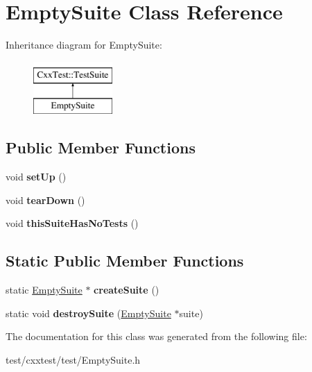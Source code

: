 \hypertarget{classEmptySuite}{\section{Empty\-Suite Class Reference}
\label{classEmptySuite}
}
Inheritance diagram for Empty\-Suite\-:\begin{figure}[H]
\begin{center}
\leavevmode
\includegraphics[height=2.000000cm]{classEmptySuite}
\end{center}
\end{figure}
\subsection*{Public Member Functions}
\begin{DoxyCompactItemize}
\item 
\hypertarget{classEmptySuite_a3f211d708f6a9aa583a7c888874a44f8}{void {\bfseries set\-Up} ()}\label{classEmptySuite_a3f211d708f6a9aa583a7c888874a44f8}

\item 
\hypertarget{classEmptySuite_adfea273a276b498d0f572b620d47d369}{void {\bfseries tear\-Down} ()}\label{classEmptySuite_adfea273a276b498d0f572b620d47d369}

\item 
\hypertarget{classEmptySuite_a731ab1740e5b588793b63a312aaad00d}{void {\bfseries this\-Suite\-Has\-No\-Tests} ()}\label{classEmptySuite_a731ab1740e5b588793b63a312aaad00d}

\end{DoxyCompactItemize}
\subsection*{Static Public Member Functions}
\begin{DoxyCompactItemize}
\item 
\hypertarget{classEmptySuite_a7cf7f1b3e84258059351be4f225a1d00}{static \hyperlink{classEmptySuite}{Empty\-Suite} $\ast$ {\bfseries create\-Suite} ()}\label{classEmptySuite_a7cf7f1b3e84258059351be4f225a1d00}

\item 
\hypertarget{classEmptySuite_a89687ffb4751bfb77dbca9eb89c3c5af}{static void {\bfseries destroy\-Suite} (\hyperlink{classEmptySuite}{Empty\-Suite} $\ast$suite)}\label{classEmptySuite_a89687ffb4751bfb77dbca9eb89c3c5af}

\end{DoxyCompactItemize}


The documentation for this class was generated from the following file\-:\begin{DoxyCompactItemize}
\item 
test/cxxtest/test/Empty\-Suite.\-h\end{DoxyCompactItemize}
